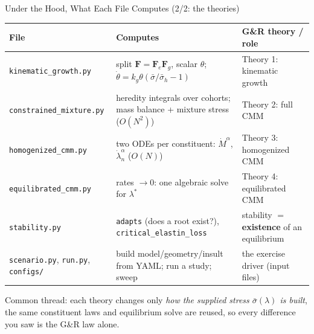 \begin{frame}[t]{Under the Hood, What Each File Computes (2/2: the theories)}
  \footnotesize
  \renewcommand{\arraystretch}{1.3}
  \begin{tabular}{@{}p{}p{}p{}@{}}
    \toprule
    \textbf{File} & \textbf{Computes} & \textbf{G\&R theory / role} \\
    \midrule
    \texttt{kinematic\_growth.py} & split $\bm{F}=\bm{F}_e\bm{F}_g$, scalar
      $\theta$; $\dot\theta=k_g\theta(\bar\sigma/\bar\sigma_h-1)$ &
      Theory 1: kinematic growth \\
    \texttt{constrained\_mixture.py} & heredity integrals over cohorts; mass
      balance + mixture stress ($O(N^2)$) & Theory 2: full CMM \\
    \texttt{homogenized\_cmm.py} & two ODEs per constituent: $\dot M^{\alpha}$,
      $\dot\lambda_n^{\alpha}$ ($O(N)$) & Theory 3: homogenized CMM \\
    \texttt{equilibrated\_cmm.py} & rates $\to 0$: one algebraic solve for
      $\lambda^*$ & Theory 4: equilibrated CMM \\
    \texttt{stability.py} & \texttt{adapts} (does a root exist?),
      \texttt{critical\_elastin\_loss} & stability $=$ \textbf{existence} of an
      equilibrium \\
    \texttt{scenario.py}, \texttt{run.py}, \texttt{configs/} & build
      model/geometry/insult from YAML; run a study; sweep & the exercise driver
      (input files) \\
    \bottomrule
  \end{tabular}
  \vspace{0.3em}
  \begin{center}\footnotesize
  Common thread: each theory changes only \emph{how the supplied stress
  $\bar\sigma(\lambda)$ is built}, the same constituent laws and equilibrium
  solve are reused, so every difference you saw is the G\&R law alone.
  \end{center}
\end{frame}

